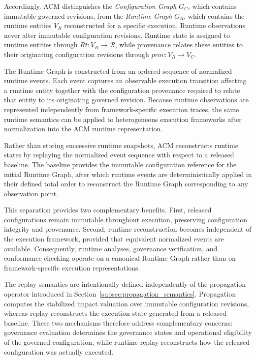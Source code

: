 \documentclass[10pt]{article}
\begin{document}
Accordingly, ACM distinguishes the \emph{Configuration Graph} $G_C$, which
contains immutable governed revisions, from the \emph{Runtime Graph} $G_R$,
which contains the runtime entities $V_R$ reconstructed for a specific
execution. Runtime observations never alter immutable configuration revisions.
Runtime state is assigned to runtime entities through
$Rt:V_R\rightarrow\mathcal R$, while provenance relates these entities to their
originating configuration revisions through $prov:V_R\rightarrow V_C$.

The Runtime Graph is constructed from an ordered sequence of normalized runtime
events. Each event captures an observable execution transition affecting a
runtime entity together with the configuration provenance required to relate
that entity to its originating governed revision. Because runtime observations
are represented independently from framework-specific execution traces, the same
runtime semantics can be applied to heterogeneous execution frameworks after
normalization into the ACM runtime representation.

Rather than storing successive runtime snapshots, ACM reconstructs runtime states
by replaying the normalized event sequence with respect to a released baseline.
The baseline provides the immutable configuration reference for the initial
Runtime Graph, after which runtime events are deterministically applied in their
defined total order to reconstruct the Runtime Graph corresponding to any
observation point.

This separation provides two complementary benefits. First, released
configurations remain immutable throughout execution, preserving configuration
integrity and provenance. Second, runtime reconstruction becomes independent of
the execution framework, provided that equivalent normalized events are
available. Consequently, runtime analyses, governance verification, and
conformance checking operate on a canonical Runtime Graph rather than on
framework-specific execution representations.

The replay semantics are intentionally defined independently of the propagation
operator introduced in Section~\ref{subsec:propagation_semantics}. Propagation
computes the stabilized impact valuation over immutable configuration revisions,
whereas replay reconstructs the execution state generated from a released
baseline. These two mechanisms therefore address complementary concerns: governance evaluation determines the governance states and operational eligibility of the governed configuration, while runtime replay reconstructs how the released configuration was actually executed.
\end{document}
